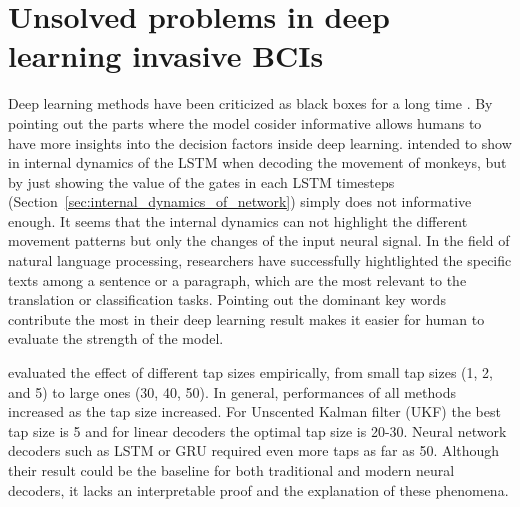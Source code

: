 \section{Unsolved problems in deep learning invasive BCIs}
\label{sec:unsolved_problems_in_deep_learning_bci}
Deep learning methods have been criticized as black boxes for a long time \citep{brown2018recurrent, hudson2018compositional}. 
By pointing out the parts where the model cosider informative allows humans to have more insights into the decision factors inside deep learning.
\cite{tseng2019decoding} intended to show in internal dynamics of the LSTM when decoding the movement of monkeys, 
but by just showing the value of the gates in each LSTM timesteps (Section~\ref{sec:internal_dynamics_of_network}) simply does not informative enough.
It seems that the internal dynamics can not highlight the different movement patterns but only the changes of the input neural signal.
In the field of natural language processing, researchers have successfully hightlighted the specific texts among a sentence or a paragraph, 
which are the most relevant to the translation or classification tasks.
Pointing out the dominant key words contribute the most in their deep learning result makes it easier for human to evaluate the strength of the model.


\cite{nakagome2020empirical} evaluated the effect of different tap sizes empirically,
from small tap sizes (1, 2, and 5) to large ones (30, 40, 50).
In general, performances of all methods increased as the tap size increased.
For Unscented Kalman filter (UKF) the best tap size is 5 and for linear decoders the optimal tap size is 20-30.
Neural network decoders such as LSTM or GRU required even more taps as far as 50.
Although their result could be the baseline for both traditional and modern neural decoders,
it lacks an interpretable proof and the explanation of these phenomena.


